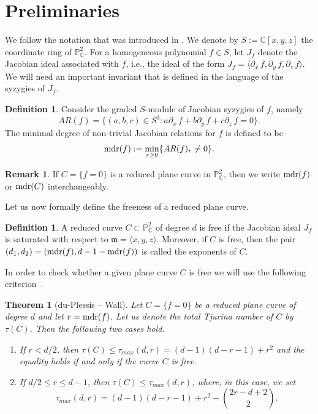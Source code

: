 \documentclass[12pt]{article}
\theoremstyle{plain}
\newtheorem{theorem}[thm]{Theorem}
\theoremstyle{definition}
\newtheorem{definition}[thm]{Definition}
\newtheorem{remark}[thm]{Remark}
\begin{document}
\section{Preliminaries}
We follow the notation that was introduced in \cite{Dimca}. We denote by $S := \mathbb{C}[x,y,z]$ the coordinate ring of $\mathbb{P}^{2}_{\mathbb{C}}$. For a homogeneous polynomial $f \in S$, let $J_{f}$ denote the Jacobian ideal associated with $f$, i.e., the ideal of the form $J_{f} = \langle \partial_{x}\, f, \partial_{y} \, f, \partial_{z} \, f \rangle$. We will need an important invariant that is defined in the language of the syzygies of $J_{f}$.
\begin{definition}
Consider the graded $S$-module of Jacobian syzygies of $f$, namely $$AR(f)=\{(a,b,c)\in S^3 : a\partial_{x} \, f + b \partial_{y} \, f + c \partial_{z} \, f = 0 \}.$$
The minimal degree of non-trivial Jacobian relations for $f$ is defined to be 
$${\rm mdr}(f):=\min_{r\geq 0}\{AR(f)_r\neq 0\}.$$ 
\end{definition}
\begin{remark}
If $C = \{f=0\}$ is a reduced plane curve in $\mathbb{P}^{2}_{\mathbb{C}}$, then we write ${\rm mdr}(f)$ or ${\rm mdr}(C)$ interchangeably.
\end{remark}
Let us now formally define the freeness of a reduced plane curve.
\begin{definition}
A reduced curve $C \subset \mathbb{P}^{2}_{\mathbb{C}}$ of degree $d$ is free if the Jacobian ideal $J_{f}$ is saturated with respect to $\mathfrak{m} = \langle x,y,z\rangle$. Moreover, if $C$ is free, then the pair $(d_{1}, d_{2}) = ({\rm mdr}(f), d - 1 - {\rm mdr}(f))$ is called the exponents of $C$.
\end{definition}
In order to check whether a given plane curve $C$ is free we will use the following 
criterion~\cite{duP}.
\begin{theorem}[du-Plessis -- Wall]
\label{dup}
Let $C = \{f=0\}$ be a reduced plane curve of degree $d$ and let $r = {\rm mdr}(f)$. Let us denote the total Tjurina number of $C$ by $\tau(C)$.
Then the following two cases hold.
\begin{enumerate}
\item[a)] If $r < d/2$, then $\tau(C) \leq \tau_{max}(d,r)= (d-1)(d-r-1)+r^2$ and the equality holds if and only if the curve $C$ is free.
\item[b)] If $d/2 \leq r \leq d-1$, then
$\tau(C) \leq \tau_{max}(d,r)$,
where, in this case, we set
$$\tau_{max}(d,r)=(d-1)(d-r-1)+r^2- \binom{2r-d+2}{2}.$$
\end{enumerate}
\end{theorem}
\end{document}
